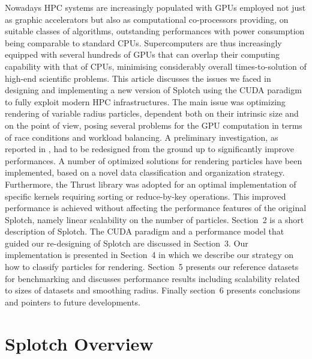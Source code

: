 \documentclass[1p]{elsarticle}
\begin{document}
Nowadays HPC systems are increasingly populated with GPUs employed not just as graphic accelerators but also as computational co-processors providing, on suitable classes of algorithms, outstanding performances with power consumption being comparable to standard CPUs. Supercomputers are thus increasingly equipped with several hundreds of GPUs that can overlap their computing capability with that of CPUs, minimising considerably overall times-to-solution of high-end scientific problems. This article discusses the issues we faced in designing and implementing a new version of Splotch using the CUDA paradigm \cite{cudaurl} to fully exploit modern HPC infrastructures. The main issue was optimizing rendering of variable radius particles, dependent both on their intrinsic size and on the point of view, posing several problems for the GPU computation in terms of race conditions and workload balancing. A preliminary investigation, as reported in \cite{jin:high-performance}, had to be redesigned from the ground up to significantly improve performances. A number of optimized solutions for rendering particles have been implemented, based on a novel data classification and organization strategy. Furthermore, the Thrust library \cite{thrusturl} was adopted for an optimal implementation of specific kernels requiring sorting or reduce-by-key operations.
This improved performance is achieved without affecting the performance features of the original Splotch, namely linear scalability on the number of particles. 
Section~2 is a short description of Splotch. The CUDA paradigm and a performance model that guided our re-designing of Splotch are discussed in Section~3. Our implementation is presented in Section~4 in which we describe our strategy on how to classify particles for rendering. Section~5 presents our reference datasets for benchmarking and discusses performance results including scalability related to sizes of datasets and smoothing radius. Finally section~6 presents conclusions and pointers to future developments.

\section{Splotch Overview}
\label{sec:overview}
\end{document}
